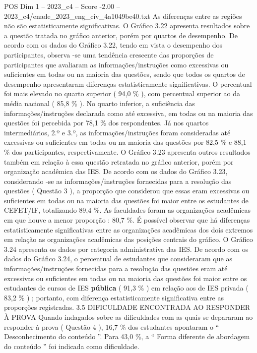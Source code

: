 \begin{textsample}{POS Dim 1 – 2023\_c4 – Score -2.00 – 2023\_c4/enade\_2023\_eng\_civ\_4a1049be40.txt}
As diferenças entre as regiões não são estatisticamente significativas.
O Gráfico 3.22 apresenta resultados sobre a questão tratada no gráfico anterior, porém por quartos de desempenho.
De acordo com os dados do Gráfico 3.22, tendo em vista o desempenho dos participantes, observa -se uma tendência crescente das proporções de participantes que avaliaram as informações/instruções como excessivas ou suficientes em todas ou na maioria das questões, sendo que todos os quartos de desempenho apresentaram diferenças estatisticamente significativas.
O percentual foi mais elevado no quarto superior ( 94,0 \% ), com percentual superior ao da média nacional ( 85,8 \% ).
No quarto inferior, a suficiência das informações/instruções declarada como até excessiva, em todas ou na maioria das questões foi percebida por 78,1 \% dos respondentes.
Já nos quartos intermediários, 2.º e 3.º, as informações/instruções foram consideradas até excessivas ou suficientes em todas ou na maioria das questões por 82,5 \% e 88,1 \% dos participantes, respectivamente.
O Gráfico 3.23 apresenta outros resultados também em relação à essa questão retratada no gráfico anterior, porém por organização acadêmica das IES.
De acordo com os dados do Gráfico 3.23, considerando -se as informações/instruções fornecidas para a resolução das questões ( Questão 3 ), a proporção que considerou que essas eram excessivas ou suficientes em todas ou na maioria das questões foi maior entre os estudantes de CEFET/IF, totalizando 89,4 \%.
As faculdades foram as organizações acadêmicas em que houve a menor proporção : 80,7 \%.
É possível observar que há diferenças estatisticamente significativas entre as organizações acadêmicas dos dois extremos em relação as organizações acadêmicas das posições centrais do gráfico.
O Gráfico 3.24 apresenta os dados por categoria administrativa das IES.
De acordo com os dados do Gráfico 3.24, o percentual de estudantes que consideraram que as informações/instruções fornecidas para a resolução das questões eram até excessivas ou suficientes em todas ou na maioria das questões foi maior entre os estudantes de cursos de IES \textbf{pública} ( 91,3 \% ) em relação aos de IES privada ( 83,2 \% ) ; portanto, com diferença estatisticamente significativa entre as proporções registradas. 3.5 DIFICULDADE ENCONTRADA AO RESPONDER À PROVA Quando indagados sobre as dificuldades com as quais se depararam ao responder à prova ( Questão 4 ), 16,7 \% dos estudantes apontaram o “ Desconhecimento do conteúdo ”.
Para 43,0 \%, a “ Forma diferente de abordagem do conteúdo ” foi indicada como dificuldade.

\end{textsample}
